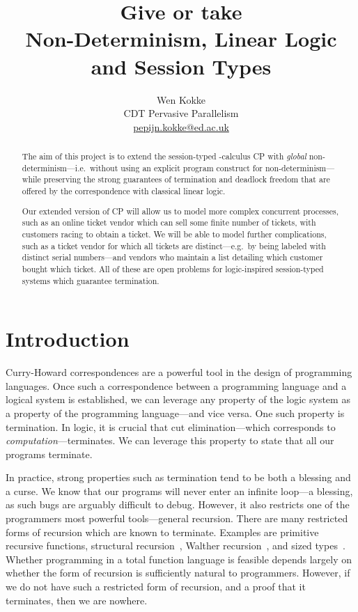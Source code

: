 \documentclass[10pt,a4paper,twocolumn,notitlepage]{article}
\title{Give or take \\
  {\large Non-Determinism, Linear Logic and Session Types}}
\author{Wen Kokke \\
  CDT Pervasive Parallelism \\
  \url{pepijn.kokke@ed.ac.uk}}
\begin{document}
\maketitle

\begin{abstract}
  The aim of this project is to extend the session-typed \textpi-calculus CP
  \citep{wadler2012} with \emph{global} non-determinism---i.e.\ without using an
  explicit program construct for non-determinism---while preserving the strong
  guarantees of termination and deadlock freedom that are offered by the
  correspondence with classical linear logic. 
  
  Our extended version of CP will allow us to model more complex concurrent
  processes, such as an online ticket vendor which can sell some finite number
  of tickets, with customers racing to obtain a ticket.
  We will be able to model further complications, such as a ticket vendor for
  which all tickets are distinct---e.g.\ by being labeled with distinct serial
  numbers---and vendors who maintain a list detailing which customer bought
  which ticket.
  All of these are open problems for logic-inspired session-typed systems which
  guarantee termination.
\end{abstract}

\section{Introduction}
Curry-Howard correspondences are a powerful tool in the design of programming
languages. Once such a correspondence between a programming language and a
logical system is established, we can leverage any property of the logic system
as a property of the programming language---and vice versa. One such property is
termination. In logic, it is crucial that cut elimination---which corresponds to
\emph{computation}---terminates. We can leverage this property to state that all
our programs terminate.

In practice, strong properties such as termination tend to be both a blessing
and a curse. We know that our programs will never enter an infinite loop---a
blessing, as such bugs are arguably difficult to debug. However, it also
restricts one of the programmers most powerful tools---general recursion.
There are many restricted forms of recursion which are known to
terminate. Examples are primitive recursive functions, structural
recursion~\citep{burstall1969}, Walther recursion~\citep{walther1994}, and sized
types~\citep{lee2001}. Whether programming in a total function language is
feasible depends largely on whether the form of recursion is sufficiently
natural to programmers.
However, if we do not have such a restricted form of recursion, and a proof that
it terminates, then we are nowhere.
\end{document}
